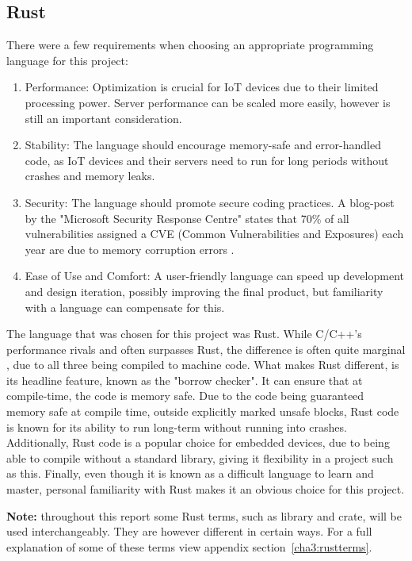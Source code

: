 \subsection{Rust} \label{sec:chapdesign:technology:rust}
There were a few requirements when choosing an appropriate programming language for this project:
\begin{enumerate} 
    \item Performance: Optimization is crucial for IoT devices due to their limited processing power. Server performance can be scaled more easily, however is still an important consideration.
    \item Stability: The language should encourage memory-safe and error-handled code, as IoT devices and their servers need to run for long periods without crashes and memory leaks.
    \item Security: The language should promote secure coding practices. A blog-post by the "Microsoft Security Response Centre" states that 70\% of all vulnerabilities assigned a CVE (Common Vulnerabilities and Exposures) each year are due to memory corruption errors \cite{ProactiveApproachToSecureCode}.
    \item Ease of Use and Comfort: A user-friendly language can speed up development and design iteration, possibly improving the final product, but familiarity with a language can compensate for this.

\end{enumerate}
The language that was chosen for this project was Rust. While C/C++'s performance rivals and often surpasses Rust, the difference is often quite marginal \cite{PerformanceEvalOnMicrocontroller}, due to all three being compiled to machine code. What makes Rust different, is its headline feature, known as the "borrow checker". It can ensure that at compile-time, the code is memory safe. Due to the code being guaranteed memory safe at compile time, outside explicitly marked unsafe blocks, Rust code is known for its ability to run long-term without running into crashes. Additionally, Rust code is a popular choice for embedded devices, due to being able to compile without a standard library, giving it flexibility in a project such as this. Finally, even though it is known as a difficult language to learn and master, personal familiarity with Rust makes it an obvious choice for this project.

\textbf{Note:} throughout this report some Rust terms, such as library and crate, will be used interchangeably. They are however different in certain ways. For a full explanation of some of these terms view appendix section~\ref{cha3:rustterms}.

